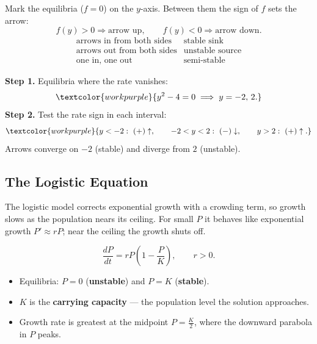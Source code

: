 \begin{formulabox}
Mark the equilibria ($f=0$) on the $y$-axis. Between them the sign of $f$ sets
the arrow:
\[ f(y) > 0 \Rightarrow \text{arrow up},\qquad f(y) < 0 \Rightarrow \text{arrow down}. \]
\[
\begin{array}{ll}
\text{arrows in from both sides} & \text{stable sink}\\
\text{arrows out from both sides} & \text{unstable source}\\
\text{one in, one out} & \text{semi-stable}
\end{array}
\]
\end{formulabox}

\begin{examplebox}[Worked Example 4.2: Phase line for $\frac{dy}{dt}=y^{2}-4$]
\textbf{Step 1.} Equilibria where the rate vanishes:
\[ \textcolor{workpurple}{y^{2} - 4 = 0 \;\Longrightarrow\; y = -2,\,2.} \]
\textbf{Step 2.} Test the rate sign in each interval:
\[ \textcolor{workpurple}{y<-2:\ (+)\uparrow, \qquad -2<y<2:\ (-)\downarrow, \qquad y>2:\ (+)\uparrow.} \]
Arrows converge on $-2$ (stable) and diverge from $2$ (unstable).
\end{examplebox}

\subsection{The Logistic Equation}

The logistic model corrects exponential growth with a crowding term, so growth
slows as the population nears its ceiling. For small $P$ it behaves like
exponential growth $P' \approx rP$; near the ceiling the growth shuts off.

\begin{formulabox}
\[ \frac{dP}{dt} = rP\!\left(1 - \frac{P}{K}\right), \qquad r>0. \]
\begin{itemize}[leftmargin=1.4em, itemsep=2pt]
    \item Equilibria: $P = 0$ (\textbf{unstable}) and $P = K$ (\textbf{stable}).
    \item $K$ is the \textbf{carrying capacity} --- the population level the
          solution approaches.
    \item Growth rate is greatest at the midpoint $P = \tfrac{K}{2}$, where the
          downward parabola in $P$ peaks.
\end{itemize}
\end{formulabox}

